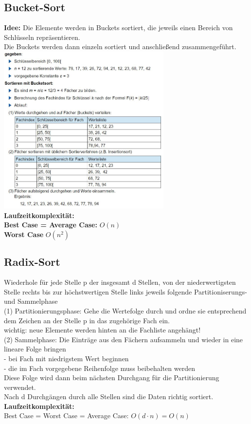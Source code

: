 \documentclass{scrreprt}
\begin{document}
\subsection{Bucket-Sort}
\textbf{Idee:} Die Elemente werden in Buckets sortiert, die jeweils einen Bereich von Schlüsseln repräsentieren.
\\Die Buckets werden dann einzeln sortiert und anschließend zusammengeführt.
\\\includegraphics[width=0.65\textwidth]{graphics/Bucketsort}
\\\textbf{Laufzeitkomplexität:} 
\\\textbf{Best Case = Average Case:} $O(n)$
\\\textbf{Worst Case} $O(n^2)$
\subsection{Radix-Sort}
Wiederhole für jede Stelle p der insgesamt d Stellen, von der niederwertigsten
Stelle rechts bis zur höchstwertigen Stelle links jeweils folgende Partitioniserungs-
und Sammelphase
\\(1) Partitionierungsphase: Gehe die Wertefolge durch und ordne sie
entsprechend dem Zeichen an der Stelle p in das zugehörige Fach ein.
\\wichtig: neue Elemente werden hinten an die Fachliste angehängt!
\\(2) Sammelphase: Die Einträge aus den Fächern aufsammeln und wieder in
eine lineare Folge bringen
\\- bei Fach mit niedrigstem Wert beginnen
\\- die im Fach vorgegebene Reihenfolge muss beibehalten werden
\\Diese Folge wird dann beim nächsten Durchgang für die Partitionierung
verwendet.
\\Nach d Durchgängen durch alle Stellen sind die Daten richtig sortiert.
\\\textbf{Laufzeitkomplexität:}
\\Best Case = Worst Case = Average Case: $O(d \cdot n) = O(n)$
\end{document}
